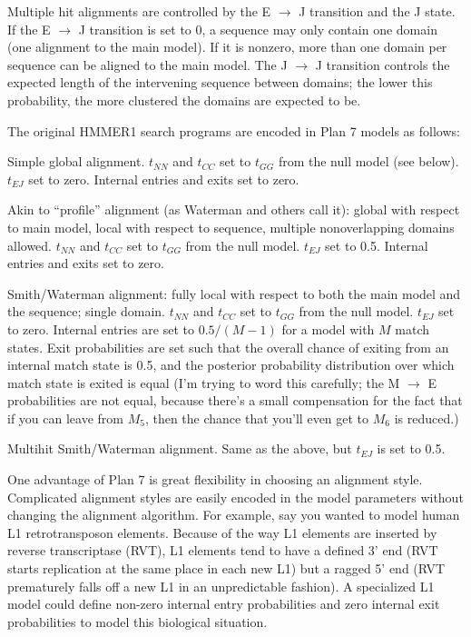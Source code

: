Multiple hit alignments are controlled by the E $\rightarrow$ J
transition and the J state. If the E $\rightarrow$ J transition is set
to 0, a sequence may only contain one domain (one alignment to the
main model). If it is nonzero, more than one domain per sequence can
be aligned to the main model. The J $\rightarrow$ J transition
controls the expected length of the intervening sequence between
domains; the lower this probability, the more clustered the domains
are expected to be.

The original HMMER1 search programs are encoded in Plan 7 models as
follows:

\begin{wideitem}
\item [\emprog{hmms}] Simple global alignment. $t_{NN}$ and $t_{CC}$ set to
$t_{GG}$ from the null model (see below). $t_{EJ}$ set to
zero. Internal entries and exits set to zero.

\item [\emprog{hmmls}] Akin to ``profile'' alignment (as Waterman and others
call it): global with respect to main model, local with respect to
sequence, multiple nonoverlapping domains allowed. $t_{NN}$ and
$t_{CC}$ set to $t_{GG}$ from the null model. $t_{EJ}$ set to
0.5. Internal entries and exits set to zero.
 
\item [\emprog{hmmsw}] Smith/Waterman alignment: fully local with 
respect to both the main model and the sequence; single domain.
$t_{NN}$ and $t_{CC}$ set to $t_{GG}$ from the null model. $t_{EJ}$
set to zero. Internal entries are set to $0.5/(M-1)$ for a model with
$M$ match states. Exit probabilities are set such that the overall
chance of exiting from an internal match state is 0.5, and the
posterior probability distribution over which match state is exited is
equal (I'm trying to word this carefully; the M $\rightarrow$ E
probabilities are not equal, because there's a small compensation for
the fact that if you can leave from $M_5$, then the chance that you'll
even get to $M_6$ is reduced.)

\item [\emprog{hmmfs}] Multihit Smith/Waterman alignment. Same
as the above, but $t_{EJ}$ is set to 0.5.
\end{wideitem}


One advantage of Plan 7 is great flexibility in choosing an alignment
style. Complicated alignment styles are easily encoded in the model
parameters without changing the alignment algorithm.  For example, say
you wanted to model human L1 retrotransposon elements. Because of the
way L1 elements are inserted by reverse transcriptase (RVT), L1
elements tend to have a defined 3' end (RVT starts replication at the
same place in each new L1) but a ragged 5' end (RVT prematurely falls
off a new L1 in an unpredictable fashion). A specialized L1 model
could define non-zero internal entry probabilities and zero internal
exit probabilities to model this biological situation.

